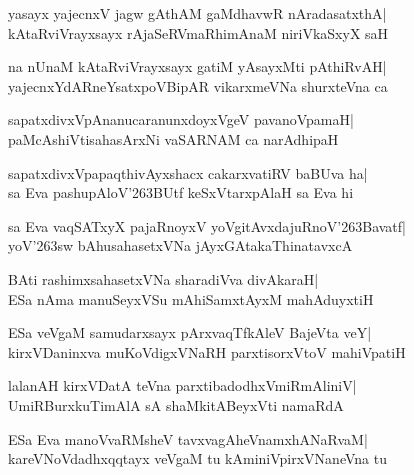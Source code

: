 \documentclass[twoside,12pt,openright]{book}
\def\S{\char'263}
\newcounter{shloka}[chapter]
\begin{document}
\begin{shloka}%
yasayx yajecnxV jagw gAthAM gaMdhavwR nAradasatxthA|\\
kAtaRviVrayxsayx rAjaSeRVmaRhimAnaM niriVkaSxyX saH
\end{shloka}

\begin{shloka}%
na nUnaM kAtaRviVrayxsayx gatiM yAsayxMti pAthiRvAH|\\
yajecnxYdARneYsatxpoVBipAR vikarxmeVNa shurxteVna ca
\end{shloka}

\begin{shloka}%
sapatxdivxVpAnanucaranunxdoyxVgeV pavanoVpamaH|\\
paMcAshiVtisahasArxNi vaSARNAM ca narAdhipaH
\end{shloka}

\begin{shloka}%
sapatxdivxVpapaqthivAyxshacx cakarxvatiRV baBUva ha|\\
sa Eva pashupAloV\S BUtf keSxVtarxpAlaH sa Eva hi
\end{shloka}

\begin{shloka}%
sa Eva vaqSATxyX pajaRnoyxV yoVgitAvxdajuRnoV\S Bavatf|\\
yoV\S sw bAhusahasetxVNa jAyxGAtakaThinatavxcA
\end{shloka}

\begin{shloka}%
BAti rashimxsahasetxVNa sharadiVva divAkaraH|\\
ESa nAma manuSeyxVSu mAhiSamxtAyxM mahAduyxtiH
\end{shloka}

\begin{shloka}%
ESa veVgaM samudarxsayx pArxvaqTfkAleV BajeVta veY|\\
kirxVDaninxva muKoVdigxVNaRH parxtisorxVtoV mahiVpatiH
\end{shloka}

\begin{shloka}%
lalanAH kirxVDatA teVna parxtibadodhxVmiRmAliniV|\\
UmiRBurxkuTimAlA sA shaMkitABeyxVti namaRdA
\end{shloka}

\begin{shloka}%
ESa Eva manoVvaRMsheV tavxvagAheVnamxhANaRvaM|\\
kareVNoVdadhxqqtayx veVgaM tu kAminiVpirxVNaneVna tu
\end{shloka}
\end{document}
